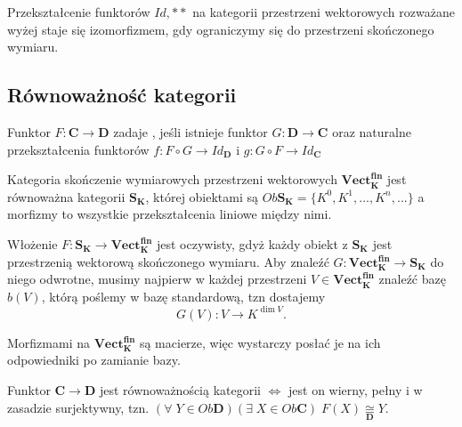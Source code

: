 \begin{example}
  \item Przekształcenie funktorów $Id, **$ na kategorii przestrzeni wektorowych rozważane wyżej staje się izomorfizmem, gdy ograniczymy się do przestrzeni skończonego wymiaru.
\end{example}

\subsection{Równoważność kategorii}

\begin{definition}
  Funktor $F:\mathbf{C}\to\mathbf{D}$ zadaje , jeśli istnieje funktor $G:\mathbf{D}\to\mathbf{C}$ oraz naturalne przekształcenia funktorów $f:F\circ G\to Id_{\mathbf{D}}$ i $g:G\circ F\to Id_{\mathbf{C}}$
\end{definition}

\begin{example}
\item Kategoria skończenie wymiarowych przestrzeni wektorowych $\mathbf{Vect_K^{fin}}$ jest równoważna kategorii $\mathbf{S_K}$, której obiektami są $Ob\mathbf{S_K}=\{K^0,K^1,...,K^n,...\}$ a morfizmy to wszystkie przekształcenia liniowe między nimi.

  Włożenie $F:\mathbf{S_K}\to \mathbf{Vect_K^{fin}}$ jest oczywisty, gdyż każdy obiekt z $\mathbf{S_K}$ jest przestrzenią wektorową skończonego wymiaru. Aby znaleźć $G:\mathbf{Vect_K^{fin}}\to \mathbf{S_K}$ do niego odwrotne, musimy najpierw w każdej przestrzeni $V\in\mathbf{Vect_K^{fin}}$ znaleźć bazę $b(V)$, którą poślemy w bazę standardową, tzn dostajemy
  $$G(V):V\to K^{\dim V}.$$

  Morfizmami na $\mathbf{Vect_K^{fin}}$ są macierze, więc wystarczy posłać je na ich odpowiedniki po zamianie bazy.
\end{example}

\begin{theorem}
  Funktor $\mathbf{C}\to \mathbf{D}$ jest równoważnością kategorii $\iff$ jest on wierny, pełny i w zasadzie surjektywny, tzn. $(\forall\;Y\in Ob\mathbf{D})(\exists\;X\in Ob\mathbf{C})\;F(X)\underset{\mathbf{D}}{\cong}Y$.
\end{theorem}

